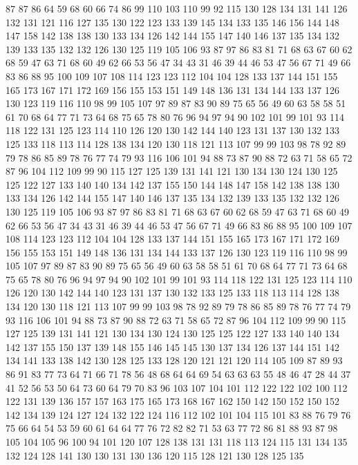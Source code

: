 87 87 86 64 59 68 60 66 74 86 99 110 103 110 99 92 115 130 128 134
131 141 126 132 131 121 116 127 135 130 122 123 133 139 145 134 133 135 146 156
144 148 147 158 142 138 138 130 133 134 126 142 144 155 147 140 146 137 135 134
132 139 133 135 132 132 126 130 125 119 105 106 93 87 97 86 83 81 71 68
63 67 60 62 68 59 47 63 71 68 60 49 62 66 53 56 47 34 43 31
46 39 44 46 53 47 56 67 71 49 66 83 86 88 95 100 109 107 108 114
123 123 112 104 104 128 133 137 144 151 155 165 173 167 171 172 169 156 155 153
151 149 148 136 131 134 144 133 137 126 130 123 119 116 110 98 99 105 107 97
89 87 83 90 89 75 65 56 49 60 63 58 58 51 61 70 68 64 77 71
73 64 68 75 65 78 80 76 96 94 97 94 90 102 101 99 101 93 114 118
122 131 125 123 114 110 126 120 130 142 144 140 123 131 137 130 132 133 125 133
118 113 114 128 138 134 120 130 118 121 113 107 99 99 103 98 78 92 89 79
78 86 85 89 78 76 77 74 79 93 116 106 101 94 88 73 87 90 88 72
63 71 58 65 72 87 96 104 112 109 99 90 115 127 125 139 131 141 121 130
134 130 124 130 125 125 122 127 133 140 140 134 142 137 155 150 144 148 147 158
142 138 138 130 133 134 126 142 144 155 147 140 146 137 135 134 132 139 133 135
132 132 126 130 125 119 105 106 93 87 97 86 83 81 71 68 63 67 60 62
68 59 47 63 71 68 60 49 62 66 53 56 47 34 43 31 46 39 44 46
53 47 56 67 71 49 66 83 86 88 95 100 109 107 108 114 123 123 112 104
104 128 133 137 144 151 155 165 173 167 171 172 169 156 155 153 151 149 148 136
131 134 144 133 137 126 130 123 119 116 110 98 99 105 107 97 89 87 83 90
89 75 65 56 49 60 63 58 58 51 61 70 68 64 77 71 73 64 68 75
65 78 80 76 96 94 97 94 90 102 101 99 101 93 114 118 122 131 125 123
114 110 126 120 130 142 144 140 123 131 137 130 132 133 125 133 118 113 114 128
138 134 120 130 118 121 113 107 99 99 103 98 78 92 89 79 78 86 85 89
78 76 77 74 79 93 116 106 101 94 88 73 87 90 88 72 63 71 58 65
72 87 96 104 112 109 99 90 115 127 125 139 131 141 121 130 134 130 124 130
125 125 122 127 133 140 140 134 142 137 155 150 137 139 148 155 146 145 145 130
137 134 126 137 144 151 142 134 141 133 138 142 130 128 125 133 128 120 121 121
120 114 105 109 87 89 93 86 91 83 77 73 64 71 66 71 78 56 48 68
64 64 69 54 63 63 63 55 48 46 47 28 44 37 41 52 56 53 50 64
73 60 64 79 70 83 96 103 107 104 101 112 122 122 102 100 112 122 131 139
136 157 157 163 175 165 173 168 167 162 150 142 150 152 150 152 142 134 139 124
127 124 132 122 124 116 112 102 101 104 115 101 83 88 76 79 76 75 66 64
54 53 59 60 61 64 64 77 76 72 82 82 71 53 63 77 72 86 81 88
93 87 98 105 104 105 96 100 94 101 120 107 128 138 131 131 118 113 124 115
131 134 135 132 124 128 141 130 130 131 130 136 120 115 128 121 130 128 125 135
